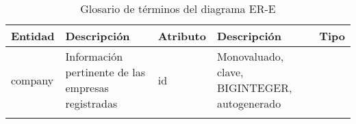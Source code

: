 \begin{table}[h!]
    
    \begin{tabular}{|p{}|p{}|p{}|p{}|p{}|}\hline
        Entidad & 
        Descripción & 
        Atributo & 
        Descripción &
        Tipo 
        
        \\\hline
        
        company & 
        Información pertinente de las empresas registradas & 
        id &
        Monovaluado, clave, BIGINTEGER, autogenerado & \\\hline
        
        & & & & \\\hline
    \end{tabular}
    
    \caption{Glosario de términos del diagrama ER-E}
    \label{glosario-ere}
\end{table}
